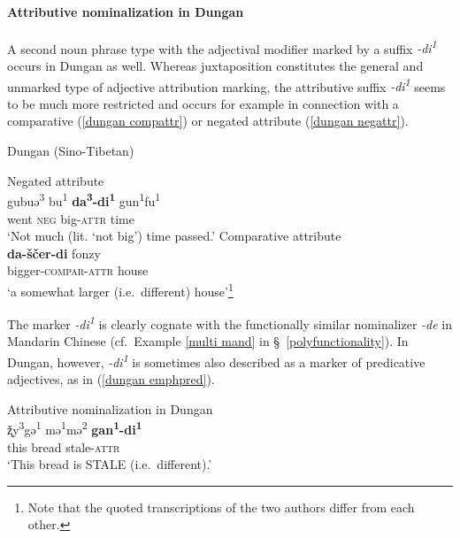 \paragraph{Attributive nominalization in Dungan}
A second noun phrase type with the adjectival modifier marked by a suffix \textit{-di\textsuperscript{1}} occurs in Dungan as well. Whereas juxtaposition constitutes the general and unmarked type of adjective attribution marking, the attributive suffix \textit{-di\textsuperscript{1}} seems to be much more restricted and occurs for example in connection with a comparative (\ref{dungan compattr}) or negated attribute (\ref{dungan negattr}).
\begin{exe}
\ex \rm{Dungan (Sino-Tibetan)}
\begin{xlist}
\ex \rm{Negated attribute \citep[80]{zevachina2001}}\\
\label{dungan negattr}
\gll	gubuə\textsuperscript{3} bu\textsuperscript{1} \textbf{da\textsuperscript{3}-di\textsuperscript{1}} gun\textsuperscript{1}fu\textsuperscript{1}\\
	went \textsc{neg} big-\textsc{attr} time\\
\glt	‘Not much (lit. ‘not big’) time passed.’
\ex \rm{Comparative attribute \citep[480]{kalimov1968}}\\
\label{dungan compattr}
\gll	\textbf{da-ščer-di} fonzy\\
	bigger-\textsc{compar}-\textsc{attr} house\\
\glt	‘a somewhat larger (i.e.~different) house’\footnote{Note that the quoted transcriptions of the two authors differ from each other.}
\end{xlist}
\end{exe}	
The marker \textit{-di\textsuperscript{1}} is clearly cognate with the functionally similar nominalizer \textit{-de} in Mandarin Chinese (cf.~Example \ref{multi mand} in \S~\ref{polyfunctionality}). In Dungan, however, \textit{-di\textsuperscript{1}} is sometimes also described as a marker of predicative adjectives, as in (\ref{dungan emphpred}).
\begin{exe}
\ex \rm{Attributive nominalization in Dungan \citep[82]{zevachina2001}}\\
\label{dungan emphpred}
\gll	ž̨y\textsuperscript{3}gə\textsuperscript{1} mə\textsuperscript{1}mə\textsuperscript{2} \textbf{gan\textsuperscript{1}-di\textsuperscript{1}}\\
	this bread stale-\textsc{attr}\\
\glt	‘This bread is STALE (i.e.~different).’
\end{exe}
